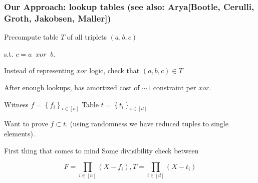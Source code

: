 \documentclass[shadesubsections,compress,14pt,mathserif]{beamer}
\newcommand{\xor}{\ensuremath{xor}}
\newcommand{\sett}[2]{\ensuremath{\left\{#1\right\}_{#2}}}
\begin{document}
\begin{frame}
 \frametitle{Our Approach: lookup tables {\normalsize (see also: Arya{\footnotesize [Bootle, Cerulli, Groth, Jakobsen, Maller]})}}
 
 
 Precompute table $T$ of all triplets $(a,b,c)$
  
  s.t. $c=a\;\;\xor\;\;b$.\pause
  
    \vspace{0.2in}

Instead of representing
$\xor$ logic, check that $(a,b,c)\in T$\pause
    \vspace{0.2in}
  
After enough lookups, has amortized cost of $\sim 1$ constraint per $\xor$.

    
\end{frame}



\begin{frame}
\end{frame}

\begin{frame}
Witness $f=\sett{f_i}{i\in [n]}$
Table $t=\sett{t_i}{i\in [d]}$

Want to prove $f\subset t$.
(using randomness we have reduced tuples to single elements).
\end{frame}

\begin{frame}
 First thing that comes to mind 
 Some divisibility check between
 
 \[F=\prod_{i\in [n]}(X-f_i), T=\prod_{i\in [d]} (X-t_i)\]
\end{frame}
% 
%  
% 




%  






\end{document}
